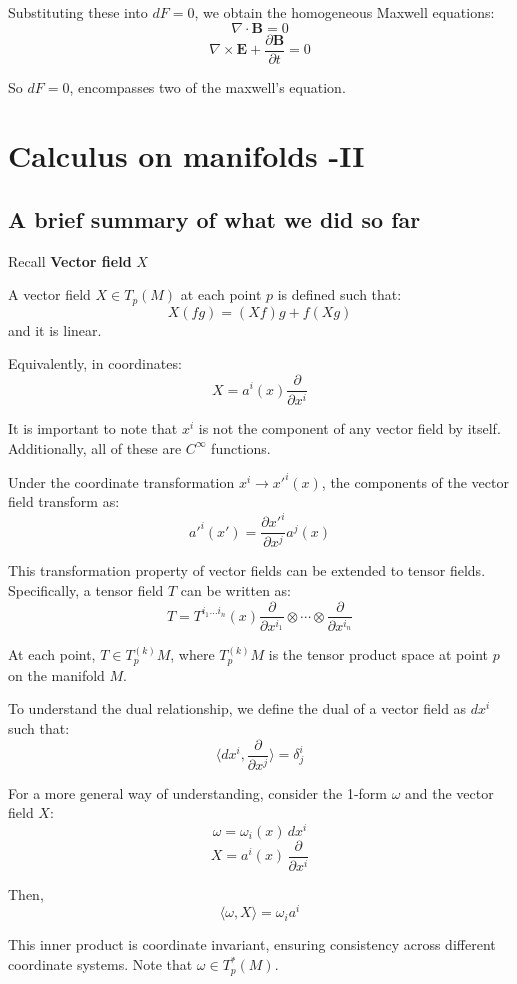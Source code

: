 \documentclass{article}
\begin{document}
Substituting these into \(dF = 0\), we obtain the homogeneous Maxwell equations:
\[
\nabla \cdot \mathbf{B} = 0
\]
\[
\nabla \times \mathbf{E} + \frac{\partial \mathbf{B}}{\partial t} = 0
\]

So \( dF = 0 \), encompasses two of the maxwell's equation.

\section{Calculus on manifolds -II} 

\subsection{A brief summary of what we did so far} 

Recall \textbf{Vector field} \(X\)

A vector field \(X \in T_p(M)\) at each point \(p\) is defined such that:
\[
X(fg) = (Xf)g + f(Xg)
\]
and it is linear.

Equivalently, in coordinates:
\[
X = a^i(x) \frac{\partial}{\partial x^i}
\]

It is important to note that \( x^i \) is not the component of any vector field by itself. Additionally, all of these are \( C^\infty \) functions. 

Under the coordinate transformation \( x^i \rightarrow x'^i(x) \), the components of the vector field transform as:
\[
a'^i(x') = \frac{\partial x'^i}{\partial x^j} a^j(x)
\]

This transformation property of vector fields can be extended to tensor fields. Specifically, a tensor field \( T \) can be written as:
\[
T = T^{i_1 \ldots i_n}(x) \frac{\partial}{\partial x^{i_1}} \otimes \cdots \otimes \frac{\partial}{\partial x^{i_n}}
\]

At each point, \( T \in T^{(k)}_p M \), where \( T^{(k)}_p M \) is the tensor product space at point \( p \) on the manifold \( M \).

To understand the dual relationship, we define the dual of a vector field as \( dx^i \) such that:
\[
\langle dx^i, \frac{\partial}{\partial x^j} \rangle = \delta^i_j
\]

For a more general way of understanding, consider the 1-form \(\omega\) and the vector field \(X\):
\[
\omega = \omega_i(x) \, dx^i
\]
\[
X = a^i(x) \, \frac{\partial}{\partial x^i}
\]

Then,
\[
\langle \omega, X \rangle = \omega_i a^i
\]

This inner product is coordinate invariant, ensuring consistency across different coordinate systems. Note that \( \omega \in T_p^*(M) \).
\end{document}
